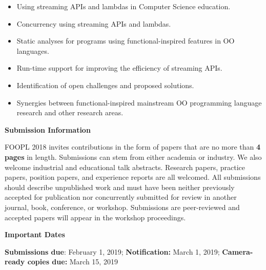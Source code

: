 \documentclass[10pt, conference]{IEEEtran}
\newcommand{\shortname}{FOOPL}
\begin{document}
\begin{itemize}
	\item Using streaming APIs and lambdas in Computer Science education.

	\item Concurrency using streaming APIs and lambdas.

	\item Static analyses for programs using functional-inspired features in OO languages.

	\item Run-time support for improving the efficiency of streaming APIs.

	\item Identification of open challenges and proposed solutions.

	\item Synergies between
		functional-inspired mainstream OO programming language research
		and other research areas.

\end{itemize}

\noindent
\textbf{\large Submission Information}

\shortname{} 2018 invites contributions in the form of papers that are no more than \textbf{4 pages} in length. Submissions can stem from either academia or industry. We also welcome industrial and educational talk abstracts. Research papers, practice papers, position papers, and experience reports are all welcomed. All submissions should describe unpublished work and must have been neither previously accepted for publication nor concurrently submitted for review in another journal, book, conference, or workshop. Submissions are peer-reviewed and accepted papers will appear in the workshop proceedings.

\noindent
\textbf{\large Important Dates}

\textbf{Submissions due}: February 1, 2019; \textbf{Notification:} March 1, 2019; \textbf{Camera-ready copies due:} March 15, 2019

\end{document}
